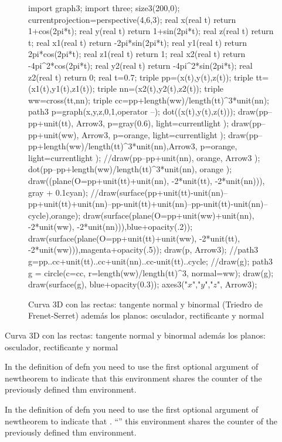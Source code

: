 \begin{figure}[!ht]
	\centering
	\begin{asy}
	import graph3;
	import three;
	size3(200,0);
	currentprojection=perspective(4,6,3);
	real x(real t) {return 1+cos(2pi*t);}
	real y(real t) {return 1+sin(2pi*t);}
	real z(real t) {return t;}
	real x1(real t) {return -2pi*sin(2pi*t);}
	real y1(real t) {return 2pi*cos(2pi*t);}
	real z1(real t) {return 1;}
	real x2(real t) {return -4pi^2*cos(2pi*t);}
	real y2(real t) {return -4pi^2*sin(2pi*t);}
	real z2(real t) {return 0;}
	real t=0.7;
	triple pp=(x(t),y(t),z(t));
	triple tt=(x1(t),y1(t),z1(t));
	triple nn=(x2(t),y2(t),z2(t));
	triple ww=cross(tt,nn);
	triple cc=pp+length(ww)/length(tt)^3*unit(nn);
	path3 p=graph(x,y,z,0,1,operator --);
	dot((x(t),y(t),z(t)));
	draw(pp--pp+unit(tt), Arrow3, p=gray(0.6), light=currentlight );
	draw(pp--pp+unit(ww), Arrow3, p=orange, light=currentlight );
	draw(pp--pp+length(ww)/length(tt)^3*unit(nn),Arrow3, p=orange, light=currentlight );
	//draw(pp--pp+unit(nn), orange, Arrow3 );
	dot(pp--pp+length(ww)/length(tt)^3*unit(nn), orange );
	draw((plane(O=pp+unit(tt)+unit(nn), -2*unit(tt), -2*unit(nn))), gray + 0.1cyan);
	//draw(surface(pp+unit(tt)-unit(nn)--pp+unit(tt)+unit(nn)--pp-unit(tt)+unit(nn)--pp-unit(tt)-unit(nn)--cycle),orange);
	draw(surface(plane(O=pp+unit(ww)+unit(nn), -2*unit(ww), -2*unit(nn))),blue+opacity(.2));
	draw(surface(plane(O=pp+unit(tt)+unit(ww), -2*unit(tt), -2*unit(ww))),magenta+opacity(.5));
	draw(p, Arrow3);
	//path3 g=pp..cc+unit(tt)..cc+unit(nn)..cc-unit(tt)..cycle;
	//draw(g);
	path3 g = circle(c=cc, r=length(ww)/length(tt)^3, normal=ww);
	draw(g);
	draw(surface(g), blue+opacity(0.3));
	axes3("$x$","$y$","$z$", Arrow3);
	\end{asy}
	\caption{Curva 3D con las rectas: tangente normal y binormal (Triedro de Frenet-Serret) además los planos: osculador, rectificante y normal}
\end{figure}

Curva 3D con las rectas: tangente normal y binormal además los planos: osculador, rectificante y normal


\begin{prop}[wwwwwwwwwwwwwwwwwwwwwwww] In the definition of defn you need to use the first optional argument of  newtheorem to indicate that this environment shares the counter of the previously defined thm environment.\end{prop}



\begin{defn}[wwwwwwwwwwwwwwwwwwwwwwww] In the definition of defn you need to use the first optional argument of  newtheorem to indicate that \cite{hilbert2020geometry}. ``''  this environment shares the counter of the previously defined thm environment.\end{defn}
	\cite{reyes}   \cite{www}   


